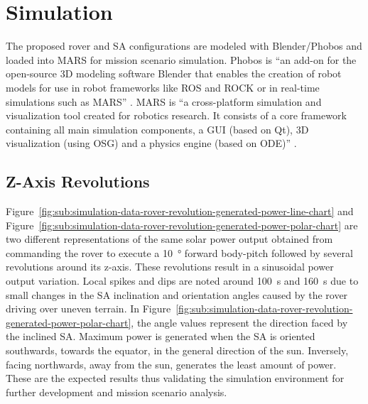 \documentclass[twocolumn,letterpaper]{IEEEAerospaceCLS}  %
\newcommand{\refFig}[1]{{Figure}~\ref{#1}} %
\begin{document}
\section{Simulation}
The proposed rover and \ac{SA} configurations are modeled with Blender/Phobos and loaded into MARS for mission scenario simulation. Phobos is ``an add-on for the open-source 3D modeling software Blender that enables the creation of robot models for use in robot frameworks like ROS and ROCK or in real-time simulations such as MARS'' \cite{Phobos}. MARS is ``a cross-platform simulation and visualization tool created for robotics research. It consists of a core framework containing all main simulation components, a GUI (based on Qt), 3D visualization (using OSG) and a physics engine (based on ODE)'' \cite{MARSSim}.

\subsection{Z-Axis Revolutions}

\refFig{fig:sub:simulation-data-rover-revolution-generated-power-line-chart} and \refFig{fig:sub:simulation-data-rover-revolution-generated-power-polar-chart} are two different representations of the same solar power output obtained from commanding the rover to execute a \SI{10}{\degree} forward body-pitch followed by several revolutions around its z-axis. These revolutions result in a sinusoidal power output variation. Local spikes and dips are noted around \SI{100}{\second} and \SI{160}{\second} due to small changes in the \ac{SA} inclination and orientation angles caused by the rover driving over uneven terrain. In \refFig{fig:sub:simulation-data-rover-revolution-generated-power-polar-chart}, the angle values represent the direction faced by the inclined \ac{SA}. Maximum power is generated when the \ac{SA} is oriented southwards, towards the equator, in the general direction of the sun. Inversely, facing northwards, away from the sun, generates the least amount of power. These are the expected results thus validating the simulation environment for further development and mission scenario analysis.
\end{document}
